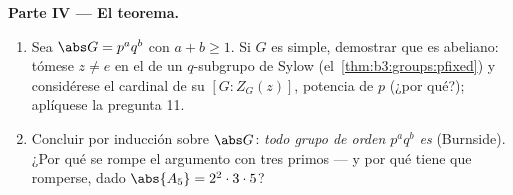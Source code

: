 \begin{problem}
\medskip
\noindent\textbf{Parte IV --- El teorema.}
\begin{enumerate}[resume]
  \item Sea $\abs G = p^aq^b$ con $a + b \geq 1$. Si $G$ es simple,
  demostrar que es abeliano: tómese $z \neq e$ en el
   de un $q$-subgrupo de Sylow
  (el~\cref{thm:b3:groups:pfixed}) y considérese el cardinal de su
   $[G : Z_G(z)]$,
  potencia de $p$ (¿por qué?); aplíquese la pregunta 11. \item Concluir
  por inducción sobre $\abs G$: \emph{todo grupo de orden $p^aq^b$ es
  } (Burnside). ¿Por qué se
  rompe el argumento con tres primos --- y por qué tiene que romperse,
  dado
        $\abs{A_5} = 2^2\cdot3\cdot5$?
\end{enumerate}


\end{problem}
